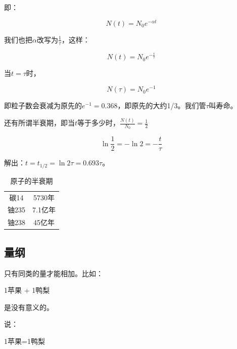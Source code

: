 即：

\begin{equation}
N(t) = N_0 e^{- \alpha t}
\end{equation}

我们也把$\alpha$改写为$\frac{1}{\tau}$，这样：

\begin{equation}
N(t) = N_0 e^{- \frac{t}{\tau}}
\end{equation}

当$t = \tau$时，

\begin{equation}
N(\tau) = N_0 e^{-1}
\end{equation}

即粒子数会衰减为原先的$e^{-1} = 0.368$，即原先的大约1/3。我们管$\tau$叫寿命。

还有所谓半衰期，即当$t$等于多少时，$\frac{N(t)}{N_0} = \frac{1}{2}$

\begin{equation*}
\ln \frac{1}{2} = - \ln 2 = - \frac{t }{\tau} 
\end{equation*}

解出：$t = t_{1/2} = \ln 2 \tau = 0.693 \tau$。

\begin{table}[htdp]
\caption{原子的半衰期}
\begin{center}
\begin{tabular}{|c|c|}
\hline
碳14 & 5730年  \\
铀235 & 7.1亿年 \\
铀238 & 45亿年 \\
\hline
\end{tabular}
\end{center}
\label{default}
\end{table}%





\subsection{量纲}


只有同类的量才能相加。比如：

\begin{center}
1苹果 + 1鸭梨
\end{center}

是没有意义的。

说：

\begin{center}
1苹果=1鸭梨
\end{center}

